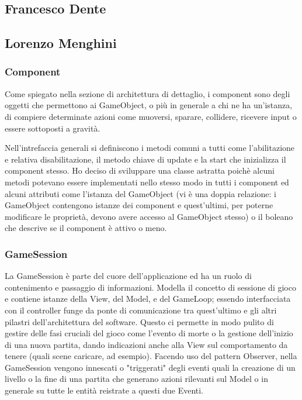 \documentclass[a4paper,12pt]{report}
\begin{document}
\subsection*{Francesco Dente}

\subsection*{Lorenzo Menghini}

\subsubsection*{Component}
Come spiegato nella sezione di architettura di dettaglio, i component sono degli oggetti che permettono ai GameObject, o più in generale a chi ne ha un'istanza, di compiere determinate azioni come muoversi, sparare, collidere, ricevere input o essere sottoposti a gravità.

Nell'intrefaccia generali si definiscono i metodi comuni a tutti come l'abilitazione e relativa disabilitazione, il metodo chiave di update e la start che inizializza il component stesso.
Ho deciso di sviluppare una classe astratta poichè alcuni metodi potevano essere implementati nello stesso modo in tutti i component ed alcuni attributi come l'istanza del GameObject (vi è una doppia relazione: i GameObject contengono istanze dei component e quest'ultimi, per poterne modificare le proprietà, devono avere accesso al GameObject stesso) o il boleano che descrive se il component è attivo o meno. 

\subsubsection*{GameSession}
La GameSession è parte del cuore dell'applicazione ed ha un ruolo di contenimento e passaggio di informazioni.
Modella il concetto di sessione di gioco e contiene istanze della View, del Model, e del GameLoop; essendo interfacciata con il controller funge da ponte di comunicazione tra quest'ultimo e gli altri pilastri dell'architettura del software. Questo ci permette in modo pulito di gestire delle fasi cruciali del gioco come l'evento di morte o la gestione dell'inizio di una nuova partita, dando indicazioni anche alla View sul comportamento da tenere (quali scene caricare, ad esempio).
Facendo uso del pattern Observer, nella GameSession vengono innescati o "triggerati" degli eventi quali la creazione di un livello o la fine di una partita che generano azioni rilevanti sul Model o in generale su tutte le entità reistrate a questi due Eventi.
\end{document}
